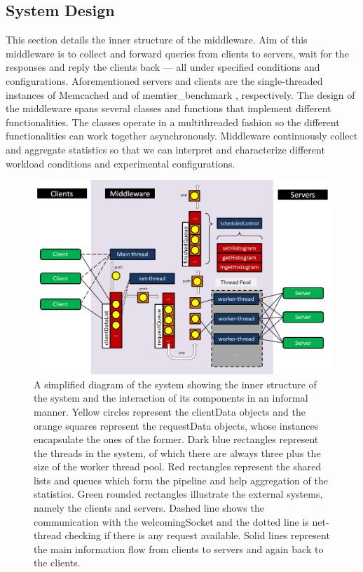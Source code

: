 \documentclass[11pt,a4paper]{article}
\begin{document}
\subsection{System Design} \label{sec:ov-system-design}
This section details the inner structure of the middleware. Aim of this middleware is to collect and forward queries from clients to servers, wait for the responses and reply the clients back — all under specified conditions and configurations. Aforementioned servers and clients are the single-threaded instances of Memcached \cite{memcached} and of memtier\_benchmark \cite{memtier}, respectively. The design of the middleware spans several classes and functions that implement different functionalities. The classes operate in a multithreaded fashion so the different functionalities can work together asynchronously. Middleware continuously collect and aggregate statistics so that we can interpret and characterize different workload conditions and experimental configurations.
\begin{figure}[h]
  \centering
  \includegraphics[width=0.8\linewidth,trim={0px 0px 0px 0px},clip]{img/system-diagram.png}
  \caption{A simplified diagram of the system showing the inner structure of the system and the interaction of its components in an informal manner. Yellow circles represent the clientData objects and the orange squares represent the requestData objects, whose instances encapsulate the ones of the former. Dark blue rectangles represent the threads in the system, of which there are always three plus the size of the worker thread pool. Red rectangles represent the shared lists and queues which form the pipeline and help aggregation of the statistics. Green rounded rectangles illustrate the external systems, namely the clients and servers. Dashed line shows the communication with the welcomingSocket and the dotted line is net-thread checking if there is any request available. Solid lines represent the main information flow from clients to servers and again back to the clients.}
  \label{fig:system-diagram}
\end{figure}
\end{document}
